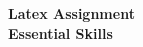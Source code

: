 \frenchspacing


\begin{center}
  { \huge \bfseries Latex Assignment \\[3cm] Essential Skills \\ } 
\end{center}

\pagebreak

